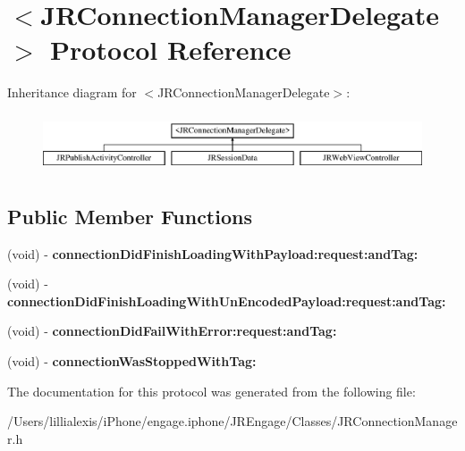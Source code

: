 \hypertarget{protocol_j_r_connection_manager_delegate-p}{
\section{$<$JRConnectionManagerDelegate$>$ Protocol Reference}
\label{protocol_j_r_connection_manager_delegate-p}
}
Inheritance diagram for $<$JRConnectionManagerDelegate$>$:\begin{figure}[H]
\begin{center}
\leavevmode
\includegraphics[height=1.744548cm]{protocol_j_r_connection_manager_delegate-p}
\end{center}
\end{figure}
\subsection*{Public Member Functions}
\begin{DoxyCompactItemize}
\item 
\hypertarget{protocol_j_r_connection_manager_delegate-p_ad1cb9d0a35fb5877a91c8df38221b6db}{
(void) -\/ {\bfseries connectionDidFinishLoadingWithPayload:request:andTag:}}
\label{protocol_j_r_connection_manager_delegate-p_ad1cb9d0a35fb5877a91c8df38221b6db}

\item 
\hypertarget{protocol_j_r_connection_manager_delegate-p_a0ecfcf07efc7bfeeebdc962678e3ca06}{
(void) -\/ {\bfseries connectionDidFinishLoadingWithUnEncodedPayload:request:andTag:}}
\label{protocol_j_r_connection_manager_delegate-p_a0ecfcf07efc7bfeeebdc962678e3ca06}

\item 
\hypertarget{protocol_j_r_connection_manager_delegate-p_ab97532c1d970e555fb0434dc93918669}{
(void) -\/ {\bfseries connectionDidFailWithError:request:andTag:}}
\label{protocol_j_r_connection_manager_delegate-p_ab97532c1d970e555fb0434dc93918669}

\item 
\hypertarget{protocol_j_r_connection_manager_delegate-p_a76efabc79d964ceca6232f9cc1472986}{
(void) -\/ {\bfseries connectionWasStoppedWithTag:}}
\label{protocol_j_r_connection_manager_delegate-p_a76efabc79d964ceca6232f9cc1472986}

\end{DoxyCompactItemize}


The documentation for this protocol was generated from the following file:\begin{DoxyCompactItemize}
\item 
/Users/lillialexis/iPhone/engage.iphone/JREngage/Classes/JRConnectionManager.h\end{DoxyCompactItemize}
